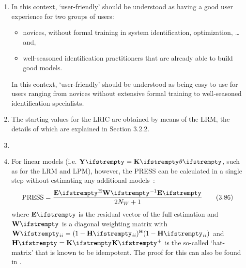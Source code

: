 \documentclass{responseletter}
\begin{document}
\begin{enumerate}
\item 
{}
\begin{oldquote}
In this context, `user-friendly' should be understood as having a good user experience for two groups of users:
\begin{itemize}
  \item novices, without formal training in system identification, optimization, \ldots and,
  \item well-seasoned identification practitioners that are already able to build good models.
\end{itemize}
\end{oldquote}
\begin{newquote}
In this context, `user-friendly' should be understood as being easy to use for users ranging from novices without extensive formal training to well-seasoned identification specialists.
\end{newquote}

\item 
{}
\begin{newquote}
The starting values for the \gls{LRIC} are obtained by means of the \gls{LRM}, the details of which are explained in Section 3.2.2.
\end{newquote}

  \item 
  
  \item 
  \begin{newquote}
 	For linear models (i.e. $\LocalVector{Y} = \LocalMatrix{K} \LocalVector{\theta}$, such as for the {LRM} and {LPM}), however, the {PRESS} can be calculated in a single step without estimating any additional models~\citep{Golub1979}:
	\begin{equation}
	\PRESS = \frac{\LocalVector{E}^{\HT} \LocalVector{W}^{-1} \LocalVector{E}}{2N_W + 1}
         \tag{3.86}
	\end{equation}
	where $\LocalVector{E}$ is the residual vector of the full estimation and $\LocalVector{W}$ is a diagonal weighting matrix with $\LocalVector{W}_{ii} = (1 - \LocalVector{H}_{ii})^{\HT} (1 - \LocalVector{H}_{ii})$ and
	$\LocalVector{H} = \LocalMatrix{K} \pinv{\LocalMatrix{K}}$ is the so-called `hat-matrix' that is known to be idempotent.
	The proof for this can also be found in \citet[Sec.~12.3.2]{Seber2003}.
  \end{newquote}


\end{enumerate}
\end{document}
